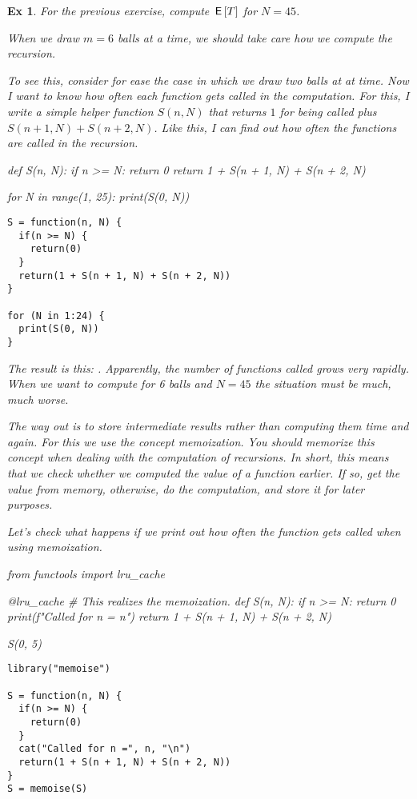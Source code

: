 \documentclass[a4paper,11pt]{article}
\newtheorem{exercise}[theorem]{Ex}
\begin{document}
\begin{exercise}
For the previous exercise, compute $\,\mathsf{E}\left[T\right]$ for $N=45$.
\begin{solution}
  When we draw $m=6$ balls at a time, we should take care how we compute the recursion.

  To see this, consider for ease the case in which we draw two balls at at time.  Now I want to know how often each function gets called in the computation. For this, I write a simple helper function $S(n, N)$ that returns $1$ for being called plus $S(n+1, N) + S(n+2, N)$. Like this, I can find out how often the functions are called in the recursion.

\begin{pyblock}
def S(n, N):
    if n >= N:
        return 0
    return 1 + S(n + 1, N) + S(n + 2, N)


for N in range(1, 25):
    print(S(0, N))
\end{pyblock}
\begin{verbatim}
S = function(n, N) {
  if(n >= N) {
    return(0)
  }
  return(1 + S(n + 1, N) + S(n + 2, N))
}

for (N in 1:24) {
  print(S(0, N))
}
\end{verbatim}
The result is this: \printpythontex.
Apparently, the number of functions called grows very rapidly.
When we want to compute for 6 balls and $N=45$ the situation must be much, much worse.

The way out is to \emph{store} intermediate results rather than computing them time and again.
For this we use the concept \emph{memoization}.
You should memorize this concept when dealing with the computation of recursions.
In short, this means that we check whether we computed the value of a function earlier.
If so, get the value from memory, otherwise, do the computation, and store it for later purposes.

Let's check what happens if we print out how often the function gets called when using memoization.
\begin{pyblock}
from functools import lru_cache

@lru_cache   # This realizes the memoization.
def S(n, N):
    if n >= N:
        return 0
    print(f"Called for n = {n}\n")
    return 1 + S(n + 1, N) + S(n + 2, N)


S(0, 5)
\end{pyblock}
\begin{verbatim}
library("memoise")

S = function(n, N) {
  if(n >= N) {
    return(0)
  }
  cat("Called for n =", n, "\n")
  return(1 + S(n + 1, N) + S(n + 2, N))
}
S = memoise(S)


\end{verbatim}
\end{solution}
\end{exercise}
\end{document}
